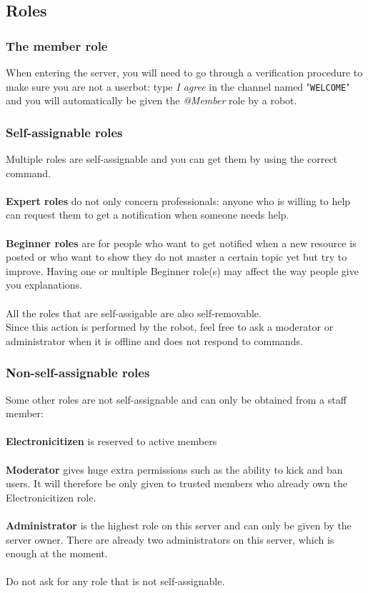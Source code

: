 \documentclass[a4paper]{article}
\begin{document}
\subsection{Roles}

\subsubsection{The member role}
When entering the server, you will need to go through a verification procedure to make sure you are not a userbot: type \textsl{I agree} in the channel named "\texttt{WELCOME}" and you will automatically be given the \textsl{@Member} role by a robot.

\subsubsection{Self-assignable roles}
Multiple roles are self-assignable and you can get them by using the correct command.\\\\
\textbf{Expert roles} do not only concern professionals: anyone who is willing to help can request them to get a notification when someone needs help.\\\\
\textbf{Beginner roles} are for people who want to get notified when a new resource is posted or who want to show they do not master a certain topic yet but try to improve. Having one or multiple Beginner role(s) may affect the way people give you explanations.\\\\
All the roles that are self-assigable are also self-removable.\\
Since this action is performed by the robot, feel free to ask a moderator or administrator when it is offline and does not respond to commands.

\subsubsection{Non-self-assignable roles}
Some other roles are not self-assignable and can only be obtained from a staff member:\\\\
\textbf{Electronicitizen} is reserved to active members\\\\
\textbf{Moderator} gives huge extra permissions such as the ability to kick and ban users. It will therefore be only given to trusted members who already own the Electronicitizen role.\\\\
\textbf{Administrator} is the highest role on this server and can only be given by the server owner. There are already two administrators on this server, which is enough at the moment.\\\\
Do not ask for any role that is not self-assignable.
\end{document}
